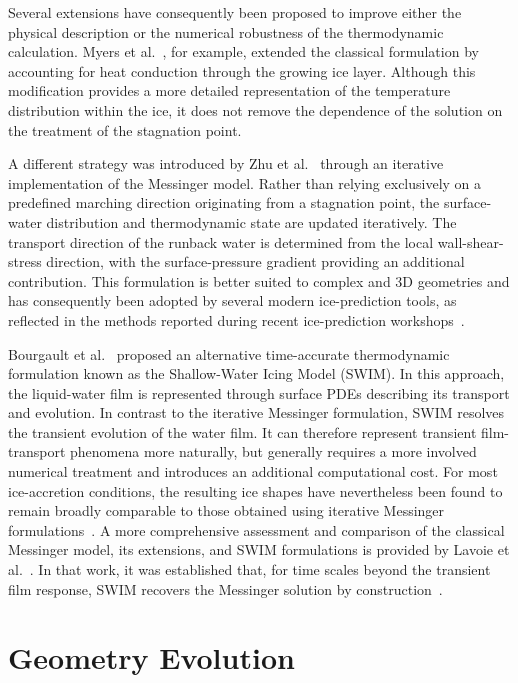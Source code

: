 Several extensions have consequently been proposed to improve either the physical description or the numerical robustness of the thermodynamic calculation. Myers et al.~\cite{myersExtension}, for example, extended the classical formulation by accounting for heat conduction through the growing ice layer. Although this modification provides a more detailed representation of the temperature distribution within the ice, it does not remove the dependence of the solution on the treatment of the stagnation point.

A different strategy was introduced by Zhu et al.~\cite{zhu2012} through an iterative implementation of the Messinger model. Rather than relying exclusively on a predefined marching direction originating from a stagnation point, the surface-water distribution and thermodynamic state are updated iteratively. The transport direction of the runback water is determined from the local wall-shear-stress direction, with the surface-pressure gradient providing an additional contribution. This formulation is better suited to complex and 3D geometries and has consequently been adopted by several modern ice-prediction tools, as reflected in the methods reported during recent ice-prediction workshops~\cite{laurendeau2022summary,laurendeau2024summary}.

Bourgault et al.~\cite{SWIM} proposed an alternative time-accurate thermodynamic formulation known as the Shallow-Water Icing Model (SWIM). In this approach, the liquid-water film is represented through surface PDEs describing its transport and evolution. In contrast to the iterative Messinger formulation, SWIM resolves the transient evolution of the water film. It can therefore represent transient film-transport phenomena more naturally, but generally requires a more involved numerical treatment and introduces an additional computational cost. For most ice-accretion conditions, the resulting ice shapes have nevertheless been found to remain broadly comparable to those obtained using iterative Messinger formulations~\cite{guardoneReview}.
A more comprehensive assessment and comparison of the classical Messinger model, its extensions, and SWIM formulations is provided by Lavoie et al.~\cite{lavoieThermo}.
In that work, it was established that, for time scales beyond the transient film response, SWIM recovers the Messinger solution by construction~\cite{lavoieThermo}.

\section{Geometry Evolution}\label{sec:review_geometry_evolution}


